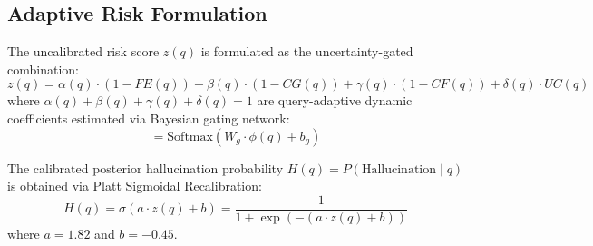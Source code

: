 \subsection{Adaptive Risk Formulation}

The uncalibrated risk score $z(q)$ is formulated as the uncertainty-gated combination:
\begin{equation}
z(q) = \alpha(q) \cdot (1 - FE(q)) + \beta(q) \cdot (1 - CG(q)) + \gamma(q) \cdot (1 - CF(q)) + \delta(q) \cdot UC(q)
\label{eq:adaptive_risk}
\end{equation}
where $\alpha(q) + \beta(q) + \gamma(q) + \delta(q) = 1$ are query-adaptive dynamic coefficients estimated via Bayesian gating network:
\begin{equation}
[\alpha(q), \beta(q), \gamma(q), \delta(q)] = \text{Softmax}\left( W_g \cdot \phi(q) + b_g \right)
\label{eq:gating_softmax}
\end{equation}

The calibrated posterior hallucination probability $H(q) = P(\text{Hallucination} \mid q)$ is obtained via Platt Sigmoidal Recalibration:
\begin{equation}
H(q) = \sigma\left( a \cdot z(q) + b \right) = \frac{1}{1 + \exp\left(-(a \cdot z(q) + b)\right)}
\label{eq:platt_scaling}
\end{equation}
where $a = 1.82$ and $b = -0.45$.
